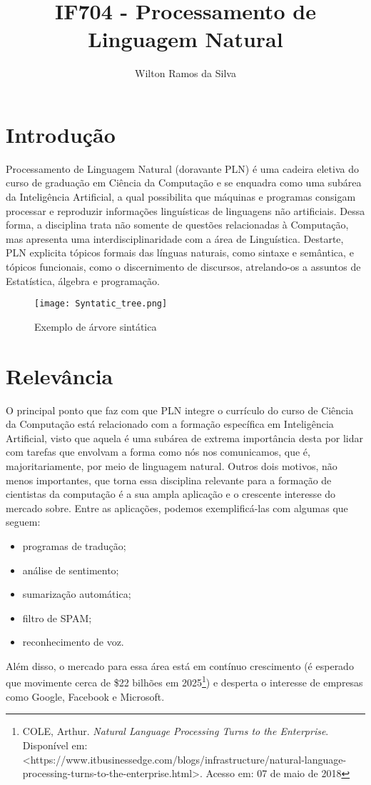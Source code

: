 \documentclass[a4paper]{article}
\title{IF704 - Processamento de Linguagem Natural}
\author{Wilton Ramos da Silva}
\begin{document}
\maketitle


\section{Introdução}

Processamento de Linguagem Natural (doravante PLN) é uma cadeira eletiva do curso de graduação em Ciência da Computação e se enquadra como uma subárea da Inteligência Artificial, a qual possibilita que máquinas e programas consigam processar e reproduzir informações linguísticas de linguagens não artificiais. Dessa forma, a disciplina trata não somente de questões relacionadas à Computação, mas apresenta uma interdisciplinaridade com a área de Linguística. Destarte, PLN explicita tópicos formais das línguas naturais, como sintaxe e semântica, e tópicos funcionais, como o discernimento de discursos, atrelando-os a assuntos de Estatística, álgebra e programação.


\begin{figure}[h]

\centering
\texttt{[image: Syntatic\_tree.png]}
\caption{\label{fig:Syntatic_tree}Exemplo de árvore sintática}
\end{figure}

\section{Relevância}

O principal ponto que faz com que PLN integre o currículo do curso de Ciência da Computação está relacionado com a formação específica em Inteligência Artificial, visto que aquela é uma subárea de extrema importância desta por lidar com tarefas que envolvam a forma como nós nos comunicamos, que é, majoritariamente, por meio de linguagem natural. Outros dois motivos, não menos importantes, que torna essa disciplina relevante para a formação de cientistas da computação é a sua ampla aplicação e o crescente interesse do mercado sobre. Entre as aplicações, podemos exemplificá-las com algumas que seguem:
\begin{itemize}
\item programas de tradução;
\item análise de sentimento;
\item sumarização automática;
\item filtro de SPAM;
\item reconhecimento de voz.
\end{itemize}
Além disso, o mercado para essa área está em contínuo crescimento (é esperado que movimente cerca de \$22 bilhões em 2025\footnote{COLE, Arthur. \textit{Natural Language Processing Turns to the Enterprise}. Disponível em: <https://www.itbusinessedge.com/blogs/infrastructure/natural-language-processing-turns-to-the-enterprise.html>. Acesso em: 07 de maio de 2018}) e desperta o interesse de empresas como Google, Facebook e Microsoft.
\end{document}
